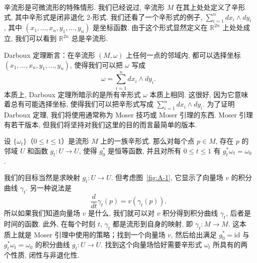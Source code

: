 辛流形是可微流形的特殊情形. 我们已经说过, 辛流形 $M$ 在其上处处定义了辛形式, 其中辛形式是闭非退化 2-形式. 我们还看了一个辛形式的例子, $\sum_{i=1}^{n}dx_i\wedge dy_i$, 其中 $(x_1,\ldots,x_n,y_1,\ldots,y_n)$ 是坐标函数. 由于这个形式显然定义在 $\mathbb{R}^{2n}$ 上处处成立, 我们可以看到 $\mathbb{R}^{2n}$ 总是辛流形.

Darboux 定理断言：在辛流形 $(M,\omega)$ 上任何一点的邻域内, 都可以选择坐标 $(x_1,\ldots,x_n,y_1,\ldots,y_n)$, 使得我们可以把 $\omega$ 写成
\[
\omega=\sum_{i=1}^{n}dx_i\wedge dy_i.
\]
本质上, Darboux 定理所暗示的是所有辛形式 $\omega$ 本质上相同. 这很好, 因为它意味着总有可能选择坐标, 使得我们可以把辛形式写成 $\sum_{i=1}^{n}dx_i\wedge dy_i$. 为了证明 Darboux 定理, 我们将使用通常称为 Moser 技巧或 Moser 引理的东西. Moser 引理有若干版本, 但我们将坚持对我们这里的目的而言最简单的版本.

\begin{lemma}[Moser 引理]\label{lem:B-1}
设 $\{\omega_t\}$（$0\leq t\leq1$）是流形 $M$ 上的一族辛形式. 那么对每个点 $p\in M$, 存在 $p$ 的邻域 $U$ 和函数 $g_t:U\to U$, 使得 $g_0^*$ 是恒等函数, 并且对所有 $0\leq t\leq1$ 有 $g_t^*\omega_t=\omega_0$.
\end{lemma}

我们的目标当然是求映射 $g_t:U\to U$. 但考虑图~\ref{fig:A-1}, 它显示了向量场 $v$ 的积分曲线 $\gamma_t$. 另一种说法是
\[
\frac{d}{dt}\gamma_t(p)=v\left(\gamma_t(p)\right).
\]
所以如果我们知道向量场 $v$ 是什么, 我们就可以对 $v$ 积分得到积分曲线 $\gamma_t$, 后者是时间的函数. 此外, 在每个时刻 $t$, $\gamma_t$ 都是流形到自身的映射, 即 $\gamma_t:M\to M$. 这本质上就是 Moser 引理中使用的策略；找到一个向量场 $v$, 然后给出满足 $g_0^*=\mathrm{id}$ 与 $g_t^*\omega_t=\omega_0$ 的积分曲线 $g_t:U\to U$. 找到这个向量场恰好需要辛形式 $\omega_t$ 所具有的两个性质, 闭性与非退化性.

